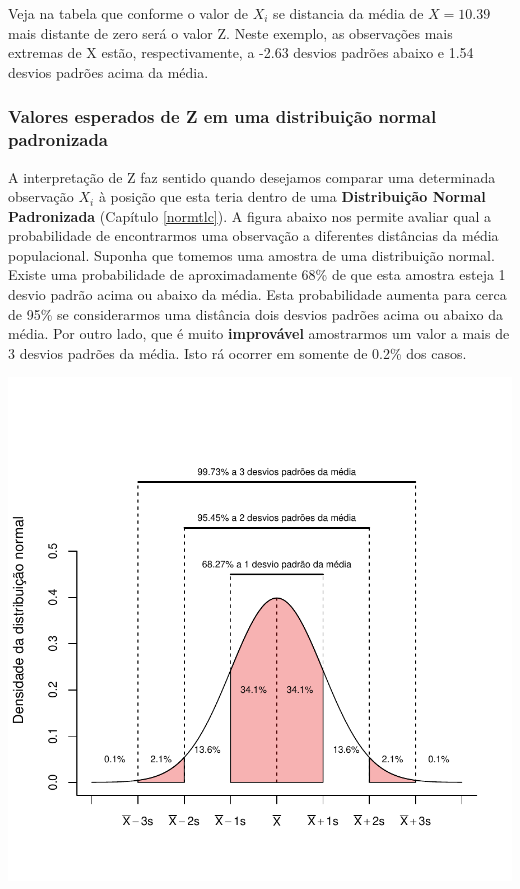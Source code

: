\documentclass[
]{book}
\begin{document}
Veja na tabela que conforme o valor de \(X_i\) se distancia da média de \(X = 10.39\) mais distante de zero será o valor Z. Neste exemplo, as observações mais extremas de X estão, respectivamente, a -2.63 desvios padrões abaixo e 1.54 desvios padrões acima da média.

\hypertarget{valores-esperados-de-z-em-uma-distribuiuxe7uxe3o-normal-padronizada}{%
\subsubsection{Valores esperados de Z em uma distribuição normal padronizada}\label{valores-esperados-de-z-em-uma-distribuiuxe7uxe3o-normal-padronizada}}

A interpretação de Z faz sentido quando desejamos comparar uma determinada observação \(X_i\) à posição que esta teria dentro de uma \textbf{Distribuição Normal Padronizada} (Capítulo \ref{normtlc}). A figura abaixo nos permite avaliar qual a probabilidade de encontrarmos uma observação a diferentes distâncias da média populacional. Suponha que tomemos uma amostra de uma distribuição normal. Existe uma probabilidade de aproximadamente 68\% de que esta amostra esteja 1 desvio padrão acima ou abaixo da média. Esta probabilidade aumenta para cerca de 95\% se considerarmos uma distância dois desvios padrões acima ou abaixo da média. Por outro lado, que é muito \textbf{improvável} amostrarmos um valor a mais de 3 desvios padrões da média. Isto rá ocorrer em somente de 0.2\% dos casos.

\begin{center}\includegraphics{probest-cambientais_files/figure-latex/distrnorm-1} \end{center}
\end{document}

